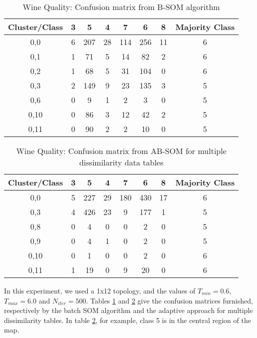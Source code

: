 \documentclass[10pt, conference, compsocconf]{IEEEtran}
\begin{document}
\begin{table}[!h]
\renewcommand{\arraystretch}{1.2}
\begin{center}
\caption{Wine Quality: Confusion matrix from B-SOM algorithm}
\begin{tabular}{|c|c|c|c|c|c|c||c|}
\hline
Cluster/Class & 3 & 5 & 4 & 7 & 6 & 8 & Majority Class\\ \hline
0,0 & 6 & 207 & 28 & 114 & 256 & 11 & 6\\ \hline
0,1 & 1 & 71 & 5 & 14 & 82 & 2 & 6\\ \hline
0,2 & 1 & 68 & 5 & 31 & 104 & 0 & 6\\ \hline
0,3 & 2 & 149 & 9 & 23 & 135 & 3 & 5\\ \hline
0,6 & 0 & 9 & 1 & 2 & 3 & 0 & 5\\ \hline
0,10 & 0 & 86 & 3 & 12 & 42 & 2 & 5\\ \hline
0,11 & 0 & 90 & 2 & 2 & 10 & 0 & 5\\ \hline
\end{tabular}
\label{winered_batch}
\end{center}
\end{table}

\begin{table}[!h]
\renewcommand{\arraystretch}{1.2}
\begin{center}
\caption{Wine Quality: Confusion matrix from AB-SOM for multiple dissimilarity data tables}
\begin{tabular}{|c|c|c|c|c|c|c||c|}
\hline
Cluster/Class & 3 & 5 & 4 & 7 & 6 & 8 & Majority Class\\ \hline
0,0 & 5 & 227 & 29 & 180 & 430 & 17 & 6\\ \hline
0,3 & 4 & 426 & 23 & 9 & 177 & 1 & 5\\ \hline
0,8 & 0 & 4 & 0 & 0 & 2 & 0 & 5\\ \hline
0,9 & 0 & 4 & 1 & 0 & 2 & 0 & 5\\ \hline
0,10 & 0 & 1 & 0 & 0 & 2 & 0 & 6\\ \hline
0,11 & 1 & 19 & 0 & 9 & 20 & 0 & 6\\ \hline
\end{tabular}
\label{winered_adaptive}
\end{center}
\end{table}

In this experiment, we used a 1x12 topology, and the values of $T_{min} = 0.6$, $T_{max} = 6.0$ and $N_{iter} = 500$. Tables \ref{winered_batch} and \ref{winered_adaptive} give the confusion matrices furnished, respectively by the batch SOM algorithm and the adaptive approach for multiple dissimilarity tables. In table \ref{winered_adaptive}, for example, class 5 is in the central region of the map.
\end{document}
